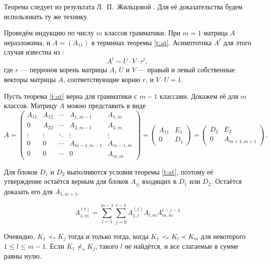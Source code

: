 \documentclass[10pt]{article}
\renewcommand{\leq}{\leqslant}
\begin{document}
Теорема следует из результата Л.~П.~Жильцовой \cite{zhiltsova-about-matrix}. Для её доказательства будем использовать ту же технику.

Проведём индукцию по числу $m$ классов грамматики. При $m = 1$ матрица $A$ неразложима, и $A = \left( A_{11} \right)$ в терминах теоремы \ref{t:at}. Асимптотика $A^t$ для этого случая известна из \cite{sevast-processes}:
\begin{equation*}
    A^t \sim U \cdot V \cdot r^t,
\end{equation*}
где $r$ --- перронов корень матрицы $A$, $U$ и $V$ --- правый и левый собственные векторы матрицы $A$, соответствующие корню $r$, и $V \cdot U = 1$.

Пусть теорема \ref{t:at} верна для грамматики с $m-1$ классами. Докажем её для $m$ классов. Матрицу $A$ можно представить в виде
\begin{equation*}
    A =
    \begin{pmatrix}
        A_{11} & A_{12} & \cdots & A_{1,m-1} & A_{1,m} \\
        0      & A_{22} & \cdots & A_{2,m-1} & A_{2,m} \\
        \vdots & \vdots & \ddots & \vdots  & \vdots    \\
        0      & 0      & \cdots & A_{m-1,m-1} & A_{m-1,m} \\
        0      & 0      & \cdots & 0       & A_{m,m}
    \end{pmatrix} =
    \begin{pmatrix}
        A_{11} & E_1 \\
        0 & D_1
    \end{pmatrix} =
    \begin{pmatrix}
        D_2 & E_2 \\
        0 & A_{m+1,m+1} 
    \end{pmatrix}.
\end{equation*}

Для блоков $D_1$ и $D_2$ выполняются условия теоремы \ref{t:at}, поэтому её утверждение остаётся верным для блоков $A_{ij}$ входящих в $D_1$ или $D_2$. Остаётся доказать его для $A_{1,m+1}$.

\begin{equation*}
    A_{1,m}^{(t)} = \sum_{l=1}^{m-1} \sum_{j=0}^{t-1} A_{1,l}^{(j)} A_{l,m} A_{m,m}^{t-j-1}
\end{equation*}

Очевидно, $K_1 \prec_* K_j$ тогда и только тогда, когда $K_1 \prec_* K_l \prec K_m$ для некоторого $1 \leq l \leq m-1$. Если $K_1 \nprec_* K_j$, такого $l$ не найдётся, и все слагаемые в сумме равны нулю.
\end{document}
